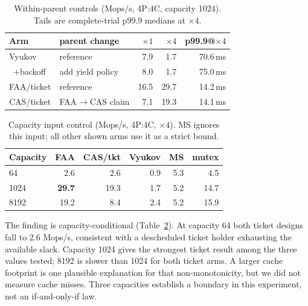 \documentclass[conference]{IEEEtran}
\begin{document}
\begin{table}[t]
\caption{Within-parent controls (Mops/s, 4P:4C, capacity 1024). Tails are
complete-trial p99.9 medians at $\times4$.}
\label{tab:controls}
\centering
\small
\begin{tabular}{@{}llrrr@{}}
\toprule
Arm & parent change & $\times1$ & $\times4$ & p99.9@$\times4$ \\
\midrule
Vyukov & reference & 7.9 & 1.7 & 70.6\,ms \\
~+backoff & add yield policy & 8.0 & 1.7 & 75.0\,ms \\
FAA/ticket & reference & 16.5 & 29.7 & 14.2\,ms \\
CAS/ticket & FAA$\to$CAS claim & 7.1 & 19.3 & 14.1\,ms \\
\bottomrule
\end{tabular}
\end{table}

\begin{table}[t]
\caption{Capacity input control (Mops/s, 4P:4C, $\times4$). MS ignores this
input; all other shown arms use it as a strict bound.}
\label{tab:capacity}
\centering
\small
\begin{tabular}{@{}lrrrrr@{}}
\toprule
Capacity & FAA & CAS/tkt & Vyukov & MS & mutex \\
\midrule
64 & 2.6 & 2.6 & 0.9 & 5.3 & 4.5 \\
1024 & \textbf{29.7} & 19.3 & 1.7 & 5.2 & 14.7 \\
8192 & 19.2 & 8.4 & 2.4 & 5.2 & 15.9 \\
\bottomrule
\end{tabular}
\end{table}

The finding is capacity-conditional (Table~\ref{tab:capacity}). At capacity 64
both ticket designs fall to 2.6 Mops/s, consistent with a descheduled ticket
holder exhausting the available slack. Capacity 1024 gives the strongest
ticket result among the three values tested; 8192 is slower than 1024 for both
ticket arms. A larger cache footprint is one plausible explanation for that
non-monotonicity, but we did not measure cache misses. Three capacities establish
a boundary in this experiment, not an if-and-only-if law.
\end{document}
